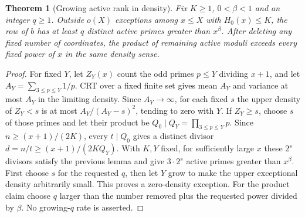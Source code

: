 \documentclass[11pt,a4paper]{article}
\newtheorem{theorem}{Theorem}[section]
\theoremstyle{definition}\newtheorem{question}[theorem]{Question}
\theoremstyle{remark}\newtheorem{remark}[theorem]{Remark}
\begin{document}
\begin{theorem}[Growing active rank in density]\label{thm:rank}
Fix $K\ge1$, $0<\beta<1$ and an integer $q\ge1$. Outside $o(X)$
exceptions among $x\le X$ with $H_0(x)\le K$, the row of $b$
has at least $q$ distinct active primes greater than $x^\beta$.
After deleting any fixed number of coordinates, the product of
remaining active moduli exceeds every fixed power of $x$ in the
same density sense.
\end{theorem}
\begin{proof}
For fixed $Y$, let $Z_Y(x)$ count the odd primes $p\le Y$ dividing
$x+1$, and let $A_Y=\sum_{3\le p\le Y}1/p$.
CRT over a fixed finite set gives mean $A_Y$ and variance at most
$A_Y$ in the limiting density. Since $A_Y\to\infty$, for each fixed
$s$ the upper density of $Z_Y<s$ is at most
$A_Y/(A_Y-s)^2$, tending to zero with $Y$.
If $Z_Y\ge s$, choose $s$ of those primes and let their product be
$Q_0\mid Q_Y=\prod_{3\le p\le Y}p$. Since
$n\ge(x+1)/(2K)$, every $t\mid Q_0$ gives a distinct divisor
$d=n/t\ge(x+1)/(2KQ_Y)$.
With $K,Y$ fixed, for sufficiently large $x$ these $2^s$ divisors
satisfy the previous lemma and give $3\cdot2^s$ active primes
greater than $x^\beta$. First choose $s$ for the requested $q$,
then let $Y$ grow to make the upper exceptional density arbitrarily
small. This proves a zero-density exception. For the product claim
choose $q$ larger than the number removed plus the requested power
divided by $\beta$. No growing-$q$ rate is asserted.
\end{proof}
\end{document}
